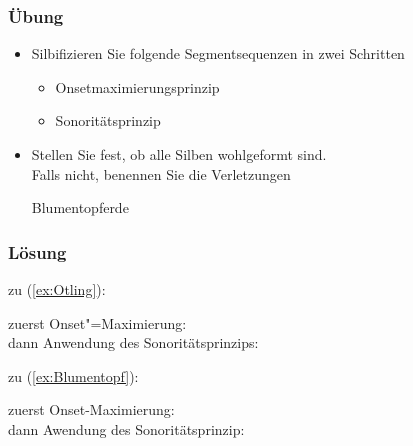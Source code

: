


\begin{frame}
\frametitle{Übung}

\begin{itemize}
	\item Silbifizieren Sie folgende Segmentsequenzen in zwei Schritten
	\begin{itemize}
		\item Onsetmaximierungsprinzip
		\item Sonoritätsprinzip
	\end{itemize}

\item Stellen Sie fest, ob alle Silben wohlgeformt sind.\\
      Falls nicht, benennen Sie die Verletzungen
	
\ea\label{ex:Otling}
\z

	\ea\label{ex:Blumentopf}
	Blumentopferde
	\z

\end{itemize}



\end{frame}


\begin{frame}
\frametitle{Lösung}

zu (\ref{ex:Otling}):

zuerst Onset"=Maximierung: \\
dann Anwendung des Sonoritätsprinzips: 

zu (\ref{ex:Blumentopf}): 

zuerst Onset-Maximierung: \\
dann Awendung des Sonoritätsprinzip: 






\end{frame}
	




